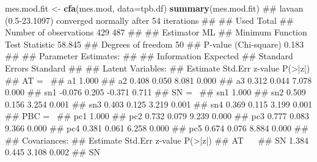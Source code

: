\documentclass[]{article}
\newenvironment{Shaded}{\begin{snugshade}}{\end{snugshade}}
\newcommand{\KeywordTok}[1]{\textcolor[rgb]{0.13,0.29,0.53}{\textbf{#1}}}
\newcommand{\DataTypeTok}[1]{\textcolor[rgb]{0.13,0.29,0.53}{#1}}
\newcommand{\StringTok}[1]{\textcolor[rgb]{0.31,0.60,0.02}{#1}}
\newcommand{\NormalTok}[1]{#1}
\theoremstyle{definition}
\theoremstyle{definition}
\theoremstyle{definition}
\theoremstyle{remark}
\begin{document}
\begin{Shaded}
\begin{Highlighting}[]
\NormalTok{mes.mod.fit <-}\StringTok{ }\KeywordTok{cfa}\NormalTok{(mes.mod, }\DataTypeTok{data=}\NormalTok{tpb.df)}
\KeywordTok{summary}\NormalTok{(mes.mod.fit)}
\NormalTok{## lavaan (0.5-23.1097) converged normally after  54 iterations}
\NormalTok{## }
\NormalTok{##                                                   Used       Total}
\NormalTok{##   Number of observations                           429         487}
\NormalTok{## }
\NormalTok{##   Estimator                                         ML}
\NormalTok{##   Minimum Function Test Statistic               58.845}
\NormalTok{##   Degrees of freedom                                50}
\NormalTok{##   P-value (Chi-square)                           0.183}
\NormalTok{## }
\NormalTok{## Parameter Estimates:}
\NormalTok{## }
\NormalTok{##   Information                                 Expected}
\NormalTok{##   Standard Errors                             Standard}
\NormalTok{## }
\NormalTok{## Latent Variables:}
\NormalTok{##                    Estimate  Std.Err  z-value  P(>|z|)}
\NormalTok{##   AT =~                                               }
\NormalTok{##     a1                1.000                           }
\NormalTok{##     a2                0.408    0.050    8.081    0.000}
\NormalTok{##     a3                0.312    0.044    7.078    0.000}
\NormalTok{##     sn1              -0.076    0.205   -0.371    0.711}
\NormalTok{##   SN =~                                               }
\NormalTok{##     sn1               1.000                           }
\NormalTok{##     sn2               0.509    0.156    3.254    0.001}
\NormalTok{##     sn3               0.403    0.125    3.219    0.001}
\NormalTok{##     sn4               0.369    0.115    3.199    0.001}
\NormalTok{##   PBC =~                                              }
\NormalTok{##     pc1               1.000                           }
\NormalTok{##     pc2               0.732    0.079    9.239    0.000}
\NormalTok{##     pc3               0.777    0.083    9.366    0.000}
\NormalTok{##     pc4               0.381    0.061    6.258    0.000}
\NormalTok{##     pc5               0.674    0.076    8.884    0.000}
\NormalTok{## }
\NormalTok{## Covariances:}
\NormalTok{##                    Estimate  Std.Err  z-value  P(>|z|)}
\NormalTok{##   AT ~~                                               }
\NormalTok{##     SN                1.384    0.445    3.108    0.002}
\NormalTok{##   SN ~~                                               }

\end{Highlighting}
\end{Shaded}
\end{document}
